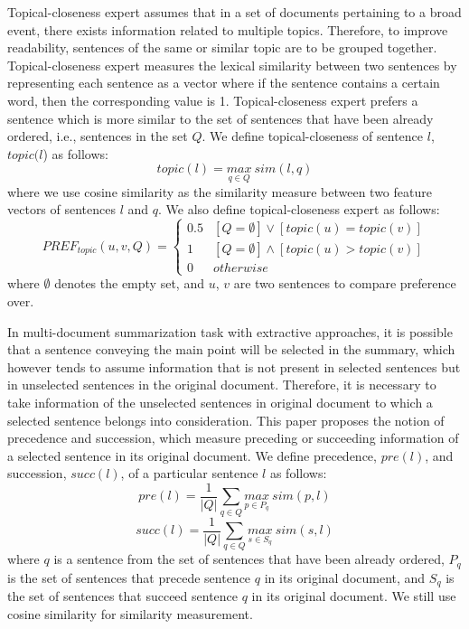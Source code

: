 \documentclass[11pt]{article}
\begin{document}
\indent
Topical-closeness expert assumes that in a set of documents pertaining to a broad event, there exists information related to multiple topics. Therefore, to improve readability, sentences of the same or similar topic are to be grouped together. Topical-closeness expert measures the lexical similarity between two sentences by representing each sentence as a vector where if the sentence contains a certain word, then the corresponding value is 1. Topical-closeness expert prefers a sentence which is more similar to the set of sentences that have been already ordered, i.e., sentences in the set $Q$. We define topical-closeness of sentence $l$, $topic(l$) as follows:
\begin{equation}
topic(l)=\underset{q\in Q}{max}\ sim(l,q)
\end{equation}
where we use cosine similarity as the similarity measure between two feature vectors of sentences $l$ and $q$. We also define topical-closeness expert as follows:
\tiny
\begin{equation}
PREF_{topic}(u,v,Q)=\begin{cases}
				0.5 & [Q=\emptyset]\vee[topic(u)=topic(v)]\\
				1 & [Q=\emptyset]\wedge[topic(u)>topic(v)]\\
				0 & otherwise
				\end{cases}
\end{equation}
\normalsize
where $\emptyset$ denotes the empty set, and $u$, $v$ are two sentences to compare preference over.

\indent
In multi-document summarization task with extractive approaches, it is possible that a sentence conveying the main point will be selected in the summary, which however tends to assume information that is not present in selected sentences but in unselected sentences in the original document. Therefore, it is necessary to take information of the unselected sentences in original document to which a selected sentence belongs into consideration. This paper proposes the notion of precedence and succession, which measure preceding or succeeding information of a selected sentence in its original document. We define precedence, $pre(l)$, and succession, $succ(l)$, of a particular sentence $l$ as follows:
\begin{equation}
pre(l)=\frac{1}{|Q|}\sum_{q\in Q}\underset{p\in P_q}{max}\ sim(p,l)
\end{equation}
\begin{equation}
succ(l)=\frac{1}{|Q|}\sum_{q\in Q}\underset{s\in S_q}{max}\ sim(s,l)
\end{equation}
where $q$ is a sentence from the set of sentences that have been already ordered, $P_q$ is the set of sentences that precede sentence $q$ in its original document, and $S_q$ is the set of sentences that succeed sentence $q$ in its original document. We still use cosine similarity for similarity measurement. 
\end{document}
